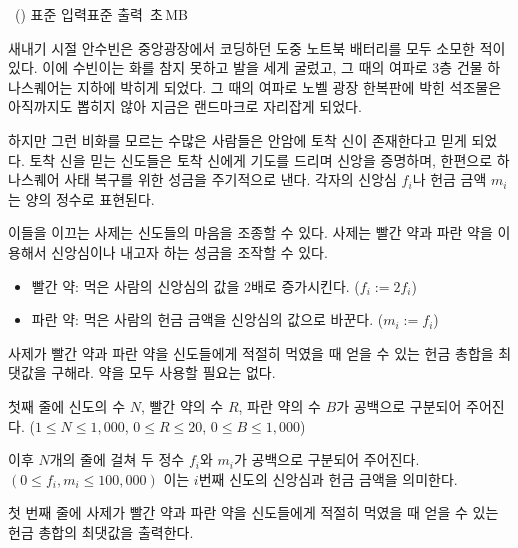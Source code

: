 \begin{problem}{\kcpcprobfaith\ (\kcpcprobfaithshort)}
    {표준 입력}{표준 출력}
    {\kcpcprobfaithtime\,초}{\kcpcprobfaithmemory\,MB}{}
    
    새내기 시절 안수빈은 중앙광장에서 코딩하던 도중 노트북 배터리를 모두 소모한 적이 있다. 이에 수빈이는 화를 참지 못하고 발을 세게 굴렀고, 그 때의 여파로 3층 건물 하나스퀘어는 지하에 박히게 되었다. 그 때의 여파로 노벨 광장 한복판에 박힌 석조물은 아직까지도 뽑히지 않아 지금은 랜드마크로 자리잡게 되었다.
    
    하지만 그런 비화를 모르는 수많은 사람들은 안암에 토착 신이 존재한다고 믿게 되었다. 토착 신을 믿는 신도들은 토착 신에게 기도를 드리며 신앙을 증명하며, 한편으로 하나스퀘어 사태 복구를 위한 성금을 주기적으로 낸다. 각자의 신앙심 $f_i$나 헌금 금액 $m_i$는 양의 정수로 표현된다.
    
    이들을 이끄는 사제는 신도들의 마음을 조종할 수 있다. 사제는 빨간 약과 파란 약을 이용해서 신앙심이나 내고자 하는 성금을 조작할 수 있다.
    
    \begin{itemize}
    \item 빨간 약: 먹은 사람의 신앙심의 값을 2배로 증가시킨다. ($f_i := 2 f_i$)
    \item 파란 약: 먹은 사람의 헌금 금액을 신앙심의 값으로 바꾼다. ($m_i := f_i$)
    \end{itemize}
    
    사제가 빨간 약과 파란 약을 신도들에게 적절히 먹였을 때 얻을 수 있는 헌금 총합을 최댓값을 구해라. 약을 모두 사용할 필요는 없다. 
    
    
    \InputFile
    첫째 줄에 신도의 수 $N$, 빨간 약의 수 $R$, 파란 약의 수 $B$가 공백으로 구분되어 주어진다. ($1 \le N \le 1,000$, $0 \le R\le 20$, $0 \le B \le 1,000$)
    
    이후 $N$개의 줄에 걸쳐 두 정수 $f_i$와 $m_i$가 공백으로 구분되어 주어진다. $(0 \leq f_i, m_i \leq 100,000)$ 이는 $i$번째 신도의 신앙심과 헌금 금액을 의미한다.
    
    \OutputFile
    첫 번째 줄에 사제가 빨간 약과 파란 약을 신도들에게 적절히 먹였을 때 얻을 수 있는 헌금 총합의 최댓값을 출력한다.
    
    \Examples
    \begin{example}
    \end{example}
\end{problem}

